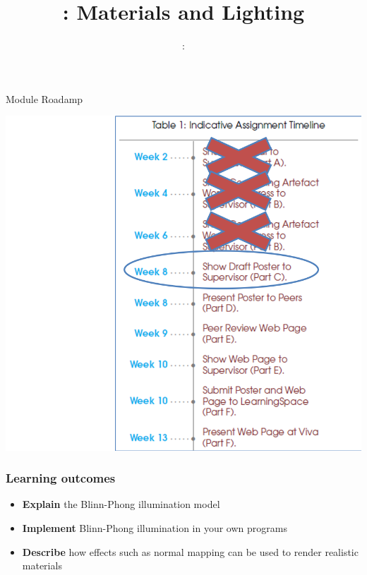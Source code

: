 \usepackage{../../beamerthemeFalmouthGamesAcademy}
\usepackage{multimedia}
\graphicspath{ {../../} }




\usepackage[normalem]{ulem}
\usepackage{wasysym}

\usepackage{pdfpages}

\usetikzlibrary{arrows,automata}




\title{\sessionnumber: Materials and Lighting}
\subtitle{\modulecode: \moduletitle}

\frame{\titlepage} 

\begin{frame}{Module Roadamp}
	\begin{center}
			\includegraphics[height=0.8\textheight]{2019-20-COMP220-roadmap}
	\end{center}
\end{frame}

\begin{frame}
	\frametitle{Learning outcomes}
	\begin{itemize}
		\item \textbf{Explain} the Blinn-Phong illumination model
		\item \textbf{Implement} Blinn-Phong illumination in your own programs
		\item \textbf{Describe} how effects such as normal mapping can be used to render realistic materials
	\end{itemize}
\end{frame}






